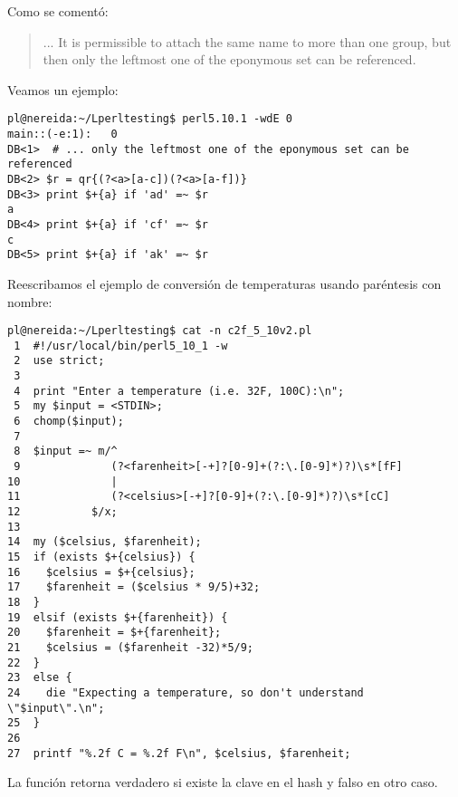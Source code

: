 Como se comentó:

\begin{it}
\begin{quotation}
... It is permissible to attach the same name to more than
one group, but then only the leftmost one of the eponymous set can be
referenced. 
\end{quotation}
\end{it}

Veamos un ejemplo:
\begin{verbatim}
pl@nereida:~/Lperltesting$ perl5.10.1 -wdE 0
main::(-e:1):   0
DB<1>  # ... only the leftmost one of the eponymous set can be referenced
DB<2> $r = qr{(?<a>[a-c])(?<a>[a-f])}
DB<3> print $+{a} if 'ad' =~ $r
a
DB<4> print $+{a} if 'cf' =~ $r
c
DB<5> print $+{a} if 'ak' =~ $r

\end{verbatim}

Reescribamos el ejemplo de conversión de temperaturas usando
paréntesis con nombre:

\begin{verbatim}
pl@nereida:~/Lperltesting$ cat -n c2f_5_10v2.pl
 1  #!/usr/local/bin/perl5_10_1 -w
 2  use strict;
 3
 4  print "Enter a temperature (i.e. 32F, 100C):\n";
 5  my $input = <STDIN>;
 6  chomp($input);
 7
 8  $input =~ m/^
 9              (?<farenheit>[-+]?[0-9]+(?:\.[0-9]*)?)\s*[fF]
10              |
11              (?<celsius>[-+]?[0-9]+(?:\.[0-9]*)?)\s*[cC]
12           $/x;
13
14  my ($celsius, $farenheit);
15  if (exists $+{celsius}) {
16    $celsius = $+{celsius};
17    $farenheit = ($celsius * 9/5)+32;
18  }
19  elsif (exists $+{farenheit}) {
20    $farenheit = $+{farenheit};
21    $celsius = ($farenheit -32)*5/9;
22  }
23  else {
24    die "Expecting a temperature, so don't understand \"$input\".\n";
25  }
26
27  printf "%.2f C = %.2f F\n", $celsius, $farenheit;
\end{verbatim}

La función  retorna verdadero si existe la clave en el hash
y falso en otro caso.  


